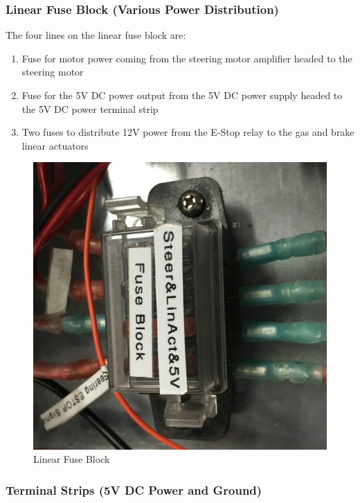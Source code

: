 \subsubsection{Linear Fuse Block (Various Power Distribution)}

\begin{minipage}{0.6\textwidth}
The four lines on the linear fuse block are:
\begin{enumerate}
\item Fuse for motor power coming from the steering motor amplifier headed to the steering motor
\item Fuse for the 5V DC power output from the 5V DC power supply headed to the 5V DC power terminal strip
\item Two fuses to distribute 12V power from the E-Stop relay to the gas and brake linear actuators
\end{enumerate}
\end{minipage} \hfill
\begin{minipage}{0.5\textwidth}
\begin{figure}[H]
\centering
\includegraphics[scale=.06]{Photos/5vblock.jpg}
\caption{\label{fig:linear} Linear Fuse Block}
\end{figure}
\end{minipage}

\subsubsection{Terminal Strips (5V DC Power and Ground)}

